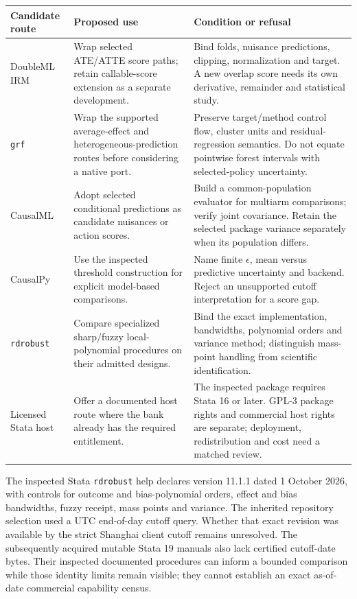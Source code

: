 \begin{longtable}{P{.19\textwidth}P{.35\textwidth}P{.36\textwidth}}
\toprule
Candidate route&Proposed use&Condition or refusal\\ \midrule
DoubleML IRM&Wrap selected ATE/ATTE score paths; retain callable-score extension
as a separate development.&Bind folds, nuisance predictions, clipping,
normalization and target. A new overlap score needs its own derivative,
remainder and statistical study.\\
\texttt{grf}&Wrap the supported average-effect and heterogeneous-prediction
routes before considering a native port.&Preserve target/method control flow,
cluster units and residual-regression semantics. Do not equate pointwise
forest intervals with selected-policy uncertainty.\\
CausalML&Adopt selected conditional predictions as candidate nuisances or
action scores.&Build a common-population evaluator for multiarm comparisons;
verify joint covariance. Retain the selected package variance separately when
its population differs.\\
CausalPy&Use the inspected threshold construction for explicit model-based
comparisons.&Name finite $\epsilon$, mean versus predictive uncertainty and
backend. Reject an unsupported cutoff interpretation for a score gap.\\
\texttt{rdrobust}&Compare specialized sharp/fuzzy local-polynomial procedures
on their admitted designs.&Bind the exact implementation, bandwidths,
polynomial orders and variance method; distinguish mass-point handling from
scientific identification.\\
Licensed Stata host&Offer a documented host route where the bank already has
the required entitlement.&The inspected package requires Stata 16 or later.
GPL-3 package rights and commercial host rights are separate; deployment,
redistribution and cost need a matched review.\\ \bottomrule
\end{longtable}

The inspected Stata \texttt{rdrobust} help declares version 11.1.1 dated
1 October 2026, with controls for outcome and bias-polynomial orders, effect
and bias bandwidths, fuzzy receipt, mass points and variance. The inherited
repository selection used a UTC end-of-day cutoff query. Whether that exact
revision was available by the strict Shanghai client cutoff remains unresolved.
The subsequently acquired mutable Stata 19 manuals also lack certified
cutoff-date bytes. Their inspected documented procedures can inform a bounded
comparison while those identity limits remain visible; they cannot establish
an exact as-of-date commercial capability census.~\citep{exec13_ivrd_rdrobust,exec13_ivrd_stata}

